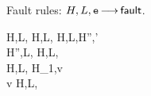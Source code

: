 \documentclass{article}
\begin{document}
\begin{display}{Fault rules: $H,L,\mbox{\texttt{{\upshape e}}}{\,\longrightarrow\,} {\ensuremath{\mathsf{fault}}}$.}
%
%




%
%

{H,L,\levalsto \fault}
{H,L,  \levalsto \fault}
\rsep
%
{H,L,\levalsto H'','\\ H'',L,\levalsto\fault}
{H,L,  \levalsto \fault}
\\[\gap]

{H,L, \gevalsto H_1,v\\
v\not\in\loc}
{H,L, \levalsto \fault}
\\[\gap]


\end{display}
\end{document}
